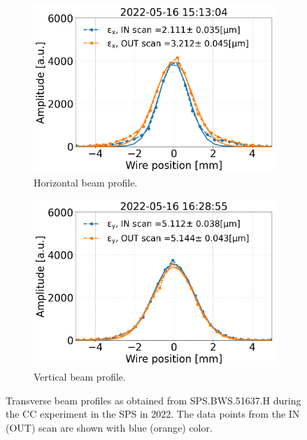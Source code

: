 \begin{figure}[htp]
    \centering
    \begin{subfigure}{.45\textwidth}
        \centering
        \includegraphics[width=.95\linewidth]{images/app_c/SPS.BWS.51637.H_IN_OUT_ 15_13_04.png}  
        \caption{Horizontal beam profile.}
        \label{fig:WS_example_profiles_H_2022}
    \end{subfigure}
    \begin{subfigure}{.45\textwidth}
        \centering
        \includegraphics[width=.95\linewidth]{images/app_c/41678.V_IN_OUT_ 16_28_55.png}  
        \caption{Vertical beam profile.}
        \label{fig:WS_example_profiles_V_2022}
    \end{subfigure}
    \caption{Transverse beam profiles as obtained from SPS.BWS.51637.H during the CC experiment in the SPS in 2022. The data points from the IN (OUT) scan are shown with blue (orange) color.}
    \label{fig:WS_example_profiles_H_V_2022}
 \end{figure}

